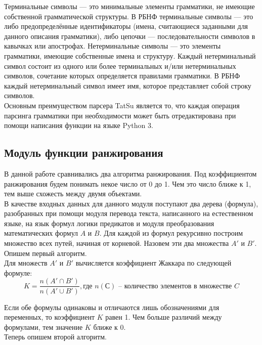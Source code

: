 \documentclass[12pt]{article}
\begin{document}
    Терминальные символы — это минимальные элементы грамматики, не имеющие собственной грамматической структуры. В РБНФ терминальные символы — это либо предопределённые идентификаторы (имена, считающиеся заданными для данного описания грамматики), либо цепочки — последовательности символов в кавычках или апострофах. Нетерминальные символы — это элементы грамматики, имеющие собственные имена и структуру. Каждый нетерминальный символ состоит из одного или более терминальных и/или нетерминальных символов, сочетание которых определяется правилами грамматики. В РБНФ каждый нетерминальный символ имеет имя, которое представляет собой строку символов.\\

Основным преимуществом парсера TatSu является то, что каждая операция парсинга грамматики при необходимости может быть отредактирована при помощи написания функции на языке Python 3.

\newpage
\subsection{Модуль функции ранжирования}
В данной работе сравнивались два алгоритма ранжирования. Под коэффициентом ранжирования будем понимать некое число от 0 до 1. Чем это число ближе к 1, тем выше схожесть между двумя объектами.\\

В качестве входных данных для данного модуля поступают два дерева (формула), разобранных при помощи  модуля перевода текста, написанного на естественном языке, на язык формул логики предикатов и модуля преобразования математических формул $A$ и $B$. Для каждой из формул рекурсивно построим множество всех путей, начиная от корневой. Назовем эти два множества $A'$ и $B'$.\\

Опишем первый алгоритм.  \\

Для множеств $A'$ и $B'$ вычисляется коэффициент Жаккара по следующей формуле: $$K=\dfrac{n(A' \cap B')}{n(A' \cup B')}, \text{где } n(С) \text{ --  количество элементов в множестве } C$$

Если обе формулы одинаковы и отличаются лишь обозначениями для переменных, то коэффициент $K$ равен 1. Чем больше различий между формулами, тем значение $K$ ближе к  $0$.\\

Теперь опишем второй алгоритм. \\
\end{document}
